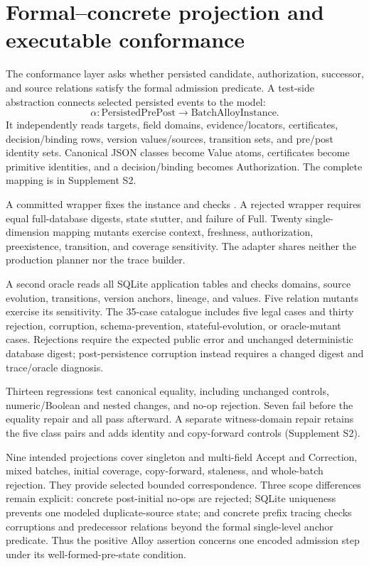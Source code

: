 \section{Formal--concrete projection and executable conformance}
\label{sec:conformance}

The conformance layer asks whether persisted candidate, authorization, successor, and source relations satisfy the formal admission predicate. A test-side abstraction connects selected persisted events to the model:
\begin{equation}
\alpha:\mathrm{PersistedPrePost}\rightarrow\mathrm{BatchAlloyInstance}.
\end{equation}
It independently reads targets, field domains, evidence/locators, certificates, decision/binding rows, version values/sources, transition sets, and pre/post identity sets. Canonical JSON classes become Value atoms, certificates become primitive identities, and a decision/binding becomes Authorization. The complete mapping is in Supplement S2.

A committed wrapper fixes the instance and checks . A rejected wrapper requires equal full-database digests, state stutter, and failure of Full. Twenty single-dimension mapping mutants exercise context, freshness, authorization, preexistence, transition, and coverage sensitivity. The adapter shares neither the production planner nor the trace builder.

A second oracle reads all SQLite application tables and checks domains, source evolution, transitions, version anchors, lineage, and values. Five relation mutants exercise its sensitivity. The 35-case catalogue includes five legal cases and thirty rejection, corruption, schema-prevention, stateful-evolution, or oracle-mutant cases. Rejections require the expected public error and unchanged deterministic database digest; post-persistence corruption instead requires a changed digest and trace/oracle diagnosis.

Thirteen regressions test canonical equality, including unchanged controls, numeric/Boolean and nested changes, and no-op rejection. Seven fail before the equality repair and all pass afterward. A separate witness-domain repair retains the five class pairs and adds identity and copy-forward controls (Supplement S2).

Nine intended projections cover singleton and multi-field Accept and Correction, mixed batches, initial coverage, copy-forward, staleness, and whole-batch rejection. They provide selected bounded correspondence. Three scope differences remain explicit: concrete post-initial no-ops are rejected; SQLite uniqueness prevents one modeled duplicate-source state; and concrete prefix tracing checks corruptions and predecessor relations beyond the formal single-level anchor predicate. Thus the positive Alloy assertion concerns one encoded admission step under its well-formed-pre-state condition.
